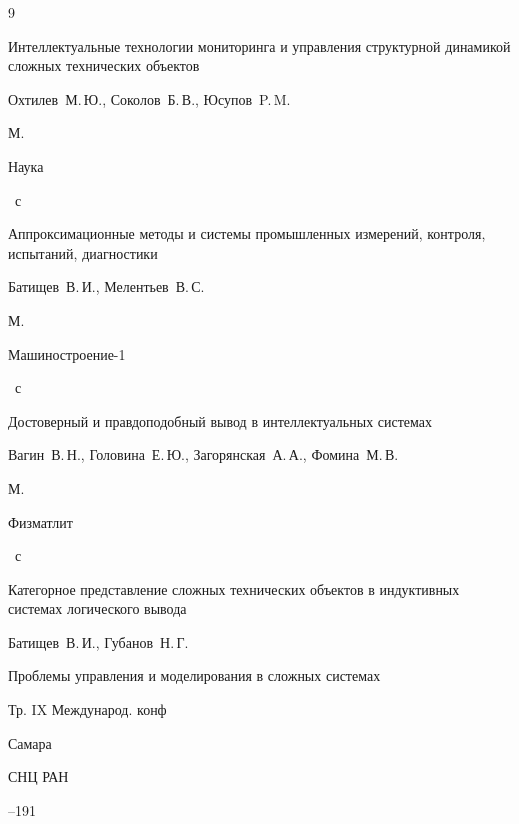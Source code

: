 \begin{thebibliography}{9}


\book Интеллектуальные технологии мониторинга и управления структурной динамикой сложных технических объектов

\by  Охтилев~М.\,Ю., Соколов~Б.\,В., Юсупов~P.\,M.

\publaddr М.

\publ Наука


~с






\book Аппроксимационные методы и системы промышленных измерений, контроля, испытаний, диагностики

\by  Батищев~В.\,И., Мелентьев~В.\,С.

\publaddr М.

\publ Машиностроение-1


~с




\book Достоверный и правдоподобный вывод в интеллектуальных системах

\by   Вагин~В.\,Н., Головина~Е.\,Ю., Загорянская~А.\,А., Фомина~М.\,В.

\publaddr М.

\publ Физматлит


~с




\paper Категорное представление сложных технических объектов в индуктивных системах логического вывода

\by  Батищев~В.\,И., Губанов~Н.\,Г.

\inbook Проблемы управления и моделирования в сложных системах

\bookinfo  Тр. IX Международ. конф

\publaddr Самара

\publ СНЦ РАН


--191







\end{thebibliography}
